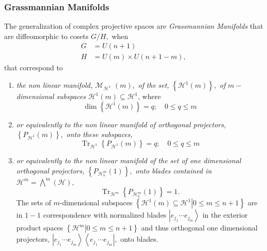 \documentclass[aps,preprint]{revtex4}%
\begin{document}
\subsubsection{Grassmannian Manifolds}

The generalization of complex projective spaces are \emph{Grassmannian
Manifolds }that are diffeomorphic to cosets $G/H,$ when
\begin{align}
G  &  =U\left(  n+1\right) \\
H  &  =U\left(  m\right)  \times U\left(  n+1-m\right)  ,
\end{align}
that correspond to\emph{ }

\begin{enumerate}
\item \emph{the non linear manifold, $\mathcal{M}_{\mathcal{H}^{\text{1}}}$%
}$\left(  m\right)  ,$\emph{ of} \emph{the} \emph{set, }$\left\{
\mathcal{H}^{1}\left(  m\right)  \right\}  ,$ \emph{of} $m-$\emph{dimensional
subspaces} $\mathcal{H}^{1}\left(  m\right)  \subseteq\mathcal{H}^{1}$, where
\begin{equation}
\dim\left\{  \mathcal{H}^{1}\left(  m\right)  \right\}  =q;\quad0\leq q\leq m
\end{equation}


\item \emph{or equivalently} \emph{to the non linear manifold of orthogonal
projectors,}$\left\{  P_{\mathcal{H}^{1}}\left(  m\right)  \right\}  ,$\emph{
onto these subspaces,}
\begin{equation}
\operatorname{Tr}_{\mathcal{H}^{1}}\left\{  P_{\mathcal{H}^{1}}\left(
m\right)  \right\}  =q;\quad0\leq q\leq m
\end{equation}


\item \emph{or equivalently to the non linear manifold of the set of one
dimensional orthogonal projectors, }$\left\{  P_{\mathcal{H}_{b}^{m}}\left(
1\right)  \right\}  ,$\emph{ onto blades contained in} $\mathcal{H}^{m}=%
{\textstyle\bigwedge\nolimits^{m}}
\left(  \mathcal{H}\right)  ,$%
\begin{equation}
\operatorname{Tr}_{\mathcal{H}^{m}}\left\{  P_{\mathcal{H}_{b}^{m}}\left(
1\right)  \right\}  =1.
\end{equation}
The sets of $m$-dimensional subspaces $\left\{  \left.  \mathcal{H}^{1}\left(
m\right)  \subseteq\mathcal{H}^{1}\right\vert 0\leq m\leq n+1\right\}  $ are
in $1-1$ correspondence with normalized blades $\left\vert e_{j_{1}}\cdots
e_{j_{m}}\right\rangle $ in the exterior product spaces $\left\{  \left.
\mathcal{H}^{m}\right\vert 0\leq m\leq n+1\right\}  $ and thus orthogonal one
dimensional projectors, $\left\vert e_{j_{1}}\cdots e_{j_{m}}\right\rangle
\left\langle e_{j_{1}}\cdots e_{j_{m}}\right\vert ,$ onto blades$.$
\end{enumerate}
\end{document}

